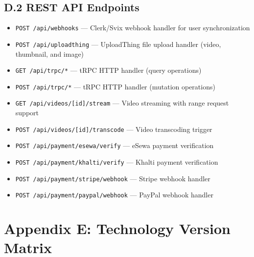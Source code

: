 \subsection*{D.2 REST API Endpoints}
{\small
\begin{itemize}[noitemsep]
  \item \texttt{POST /api/webhooks} --- Clerk/Svix webhook handler for user synchronization
  \item \texttt{POST /api/uploadthing} --- UploadThing file upload handler (video, thumbnail, and image)
  \item \texttt{GET /api/trpc/*} --- tRPC HTTP handler (query operations)
  \item \texttt{POST /api/trpc/*} --- tRPC HTTP handler (mutation operations)
  \item \texttt{GET /api/videos/[id]/stream} --- Video streaming with range request support
  \item \texttt{POST /api/videos/[id]/transcode} --- Video transcoding trigger
  \item \texttt{POST /api/payment/esewa/verify} --- eSewa payment verification
  \item \texttt{POST /api/payment/khalti/verify} --- Khalti payment verification
  \item \texttt{POST /api/payment/stripe/webhook} --- Stripe webhook handler
  \item \texttt{POST /api/payment/paypal/webhook} --- PayPal webhook handler
\end{itemize}
}


\newpage
\section*{Appendix E: Technology Version Matrix}
\label{app:versions}

